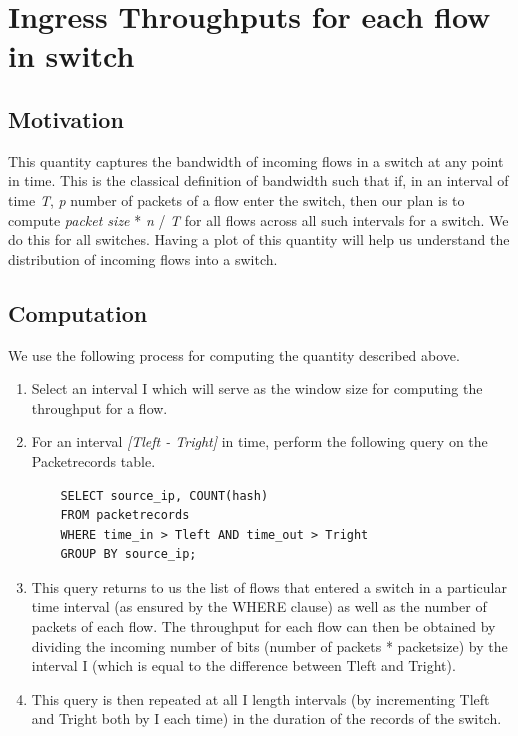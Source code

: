 \section{Ingress Throughputs for each flow in switch}

\subsection{Motivation}
This quantity captures the bandwidth of incoming flows in a switch at any point in time. This is the classical definition of bandwidth such that if, in an interval of time \emph{T},
\emph{p} number of packets of a flow enter the switch, then our plan is to compute \emph{packet size} * \emph{n} / \emph{T} for all flows
across all such intervals for a switch. We do this for all switches. Having a plot of this quantity will help us understand the distribution of incoming flows into a switch.

\subsection{Computation}
We use the following process for computing the quantity described above.

\begin{enumerate}
    \item Select an interval I which will serve as the window size for computing the throughput for a flow.
    \item For an interval \emph{ [Tleft - Tright]} in time, perform the following query on the Packetrecords table.
    \begin{verbatim}
    SELECT source_ip, COUNT(hash) 
    FROM packetrecords
    WHERE time_in > Tleft AND time_out > Tright
    GROUP BY source_ip;
    \end{verbatim}
    \item This query returns to us the list of flows that entered a switch in a particular time interval (as ensured by the WHERE clause) as well as the number of packets of
    each flow. The throughput for each flow can then be obtained by dividing the incoming number of bits (number of packets * packetsize) by the interval I (which is equal to the difference
    between Tleft and Tright).
    \item This query is then repeated at all I length intervals (by incrementing Tleft and Tright both by I each time) in the duration of the records of the switch.
\end{enumerate}

